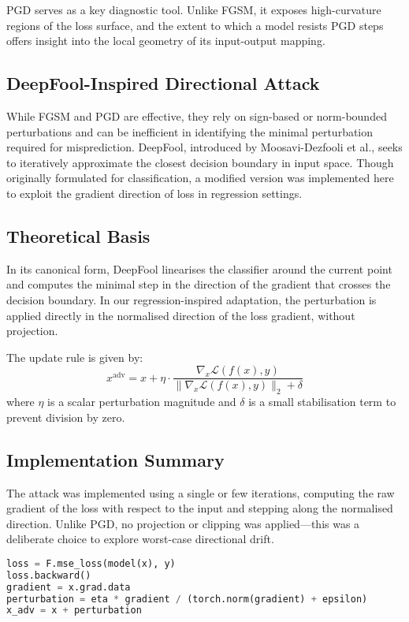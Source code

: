 PGD serves as a key diagnostic tool. Unlike FGSM, it exposes high-curvature regions of the loss surface, and the extent to which a model resists PGD steps offers insight into the local geometry of its input-output mapping.

\subsection{DeepFool-Inspired Directional Attack}

While FGSM and PGD are effective, they rely on sign-based or norm-bounded perturbations and can be inefficient in identifying the minimal perturbation required for misprediction. DeepFool, introduced by Moosavi-Dezfooli et al., seeks to iteratively approximate the closest decision boundary in input space. Though originally formulated for classification, a modified version was implemented here to exploit the gradient direction of loss in regression settings.

\subsection{Theoretical Basis}
In its canonical form, DeepFool linearises the classifier around the current point and computes the minimal step in the direction of the gradient that crosses the decision boundary. In our regression-inspired adaptation, the perturbation is applied directly in the normalised direction of the loss gradient, without projection.

The update rule is given by:
\[
x^{\text{adv}} = x + \eta \cdot \frac{\nabla_x \mathcal{L}(f(x), y)}{ \| \nabla_x \mathcal{L}(f(x), y) \|_2 + \delta }
\]
where $\eta$ is a scalar perturbation magnitude and $\delta$ is a small stabilisation term to prevent division by zero.

\subsection{Implementation Summary}
The attack was implemented using a single or few iterations, computing the raw gradient of the loss with respect to the input and stepping along the normalised direction. Unlike PGD, no projection or clipping was applied—this was a deliberate choice to explore worst-case directional drift.

\begin{lstlisting}[language=Python, caption={Directional (DeepFool-like) Gradient Attack}]
loss = F.mse_loss(model(x), y)
loss.backward()
gradient = x.grad.data
perturbation = eta * gradient / (torch.norm(gradient) + epsilon)
x_adv = x + perturbation
\end{lstlisting}

